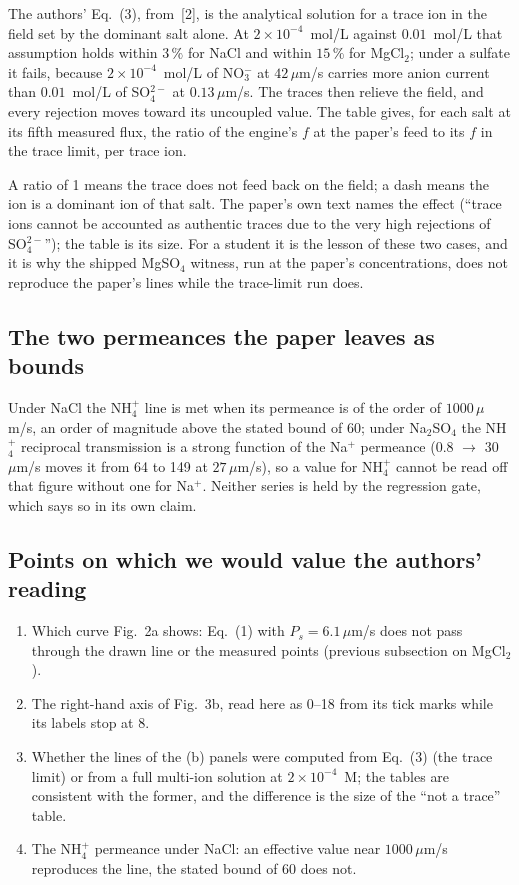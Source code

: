 The authors' Eq.~(3), from~[2], is the analytical solution for a trace ion in the
field set by the dominant salt alone.  At $2\times10^{-4}$~mol/L against
$0.01$~mol/L that assumption holds within $3\,\%$ for NaCl and within
$15\,\%$ for MgCl$_2$; under a sulfate it fails, because $2\times10^{-4}$~mol/L of NO$_3^-$ at
$42\,\mu$m/s carries more anion current than $0.01$~mol/L of SO$_4^{2-}$
at $0.13\,\mu$m/s.  The traces then relieve the field, and every rejection
moves toward its uncoupled value.  The table gives, for each salt at its
fifth measured flux, the ratio of the engine's $f$ at the paper's feed to
its $f$ in the trace limit, per trace ion.


\noindent A ratio of 1 means the trace does not feed back on the field; a
dash means the ion is a dominant ion of that salt.  The paper's own text
names the effect (``trace ions cannot be accounted as authentic traces due
to the very high rejections of SO$_4^{2-}$''); the table is its size.  For a
student it is the lesson of these two cases, and it is why the shipped
MgSO$_4$ witness, run at the paper's concentrations, does not reproduce
the paper's lines while the trace-limit run does.

\subsection*{The two permeances the paper leaves as bounds}


\noindent Under NaCl the NH$_4^+$ line is met when its permeance is of the
order of $1000\,\mu$m/s, an order of magnitude above the stated bound of
60; under Na$_2$SO$_4$ the NH$_4^+$ reciprocal transmission is a strong
function of the Na$^+$ permeance (0.8 $\to$ 30~$\mu$m/s moves it from 64 to
149 at $27\,\mu$m/s), so a value for NH$_4^+$ cannot be read off that
figure without one for Na$^+$.  Neither series is held by the regression
gate, which says so in its own claim.

\subsection*{Points on which we would value the authors' reading}

\begin{enumerate}[nosep]
\item Which curve Fig.~2a shows: Eq.~(1) with $P_s = 6.1\,\mu$m/s does not
      pass through the drawn line or the measured points (previous
      subsection on MgCl$_2$).
\item The right-hand axis of Fig.~3b, read here as 0--18 from its tick
      marks while its labels stop at 8.
\item Whether the lines of the (b) panels were computed from Eq.~(3) (the
      trace limit) or from a full multi-ion solution at $2\times10^{-4}$~M;
      the tables are consistent with the former, and the difference is the
      size of the ``not a trace'' table.
\item The NH$_4^+$ permeance under NaCl: an effective value near
      $1000\,\mu$m/s reproduces the line, the stated bound of 60 does not.
\end{enumerate}

